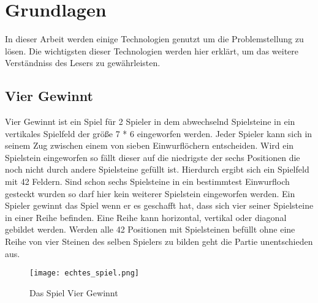 \chapter{Grundlagen}%

\label{cha:Schluss}

In dieser Arbeit werden einige Technologien genutzt um die Problemstellung zu lösen.
Die wichtigsten dieser Technologien werden hier erklärt, um das weitere Verständniss des Lesers zu gewährleisten. 


\section{Vier Gewinnt}
Vier Gewinnt ist ein Spiel für 2 Spieler in dem abwechselnd Spielsteine in ein vertikales Spielfeld der größe 7 * 6 eingeworfen werden. Jeder Spieler kann sich in seinem Zug zwischen einem von sieben Einwurflöchern entscheiden. Wird ein Spielstein eingeworfen so fällt dieser auf die niedrigste der sechs Positionen die noch nicht durch andere Spielsteine gefüllt ist. Hierdurch ergibt sich ein Spielfeld mit 42 Feldern.  Sind schon sechs Spielsteine in ein bestimmtest Einwurfloch gesteckt wurden so darf hier kein weiterer Spielstein eingeworfen werden. Ein Spieler gewinnt das Spiel wenn er es geschafft  hat, dass sich vier seiner Spielsteine in einer Reihe befinden. Eine Reihe kann horizontal, vertikal oder diagonal gebildet werden. Werden alle 42 Positionen mit Spielsteinen befüllt ohne eine Reihe von vier Steinen des selben Spielers zu bilden geht die Partie unentschieden aus.
\begin{figure}[h!]
  \texttt{[image: echtes\_spiel.png]}
  \centering
  \caption{Das Spiel Vier Gewinnt \cite{connect4}}
  \label{fig:echtes_spiel}
\end{figure}


